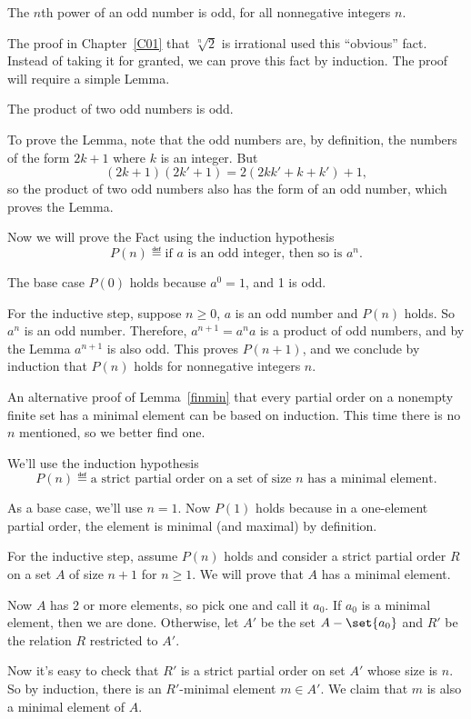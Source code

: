 \begin{fact*}
The $n$th power of an odd number is odd, for all nonnegative integers $n$.
\end{fact*}
The proof in Chapter~\ref{C01} that $\sqrt[n]{2}$ is irrational used this 
``obvious'' fact.  Instead of taking it for granted, we can prove this fact
by induction.
The proof will require a simple Lemma.
\begin{lemma*}
The product of two odd numbers is odd.
\end{lemma*}
To prove the Lemma, note that the odd numbers are, by definition, the
numbers of the form $2k+1$ where $k$ is an integer.  But
\[
(2k+1)(2k'+1) = 2(2kk' + k + k')+1,
\]
so the product of two odd numbers also has the form of an odd number,
which proves the Lemma.

Now we will prove the Fact using the induction hypothesis
\[
P(n) \eqdef \text{if $a$ is an odd integer, then so is $a^{n}$}.
\]

The base case $P(0)$ holds because $a^{0} =1$, and 1 is odd.

For the inductive step, suppose $n\geq 0$, $a$ is an odd number and $P(n)$
holds.  So $a^n$ is an odd number.  Therefore, $a^{n+1} = a^{n}a$ is a
product of odd numbers, and by the Lemma $a^{n+1}$ is also odd.  This
proves $P(n+1)$, and we conclude by induction that $P(n)$ holds for
nonnegative integers $n$.
\fi

\iffalse
An alternative proof of Lemma~\ref{finmin} that every partial order on a
nonempty finite set has a minimal element can be based on induction.  This
time there is no $n$ mentioned, so we better find one.

We'll use the induction hypothesis
\[
P(n) \eqdef \text{a strict partial order on a set of size $n$ has a minimal
  element}.
\]

As a base case, we'll use $n=1$.  Now $P(1)$ holds because in a
one-element partial order, the element is minimal (and maximal) by
definition.

For the inductive step, assume $P(n)$ holds and consider a strict partial
order $R$ on a set $A$ of size $n+1$ for $n \geq 1$.  We will prove
that $A$ has a minimal element.

Now $A$ has 2 or more elements, so pick one and call it $a_0$.  If $a_0$
is a minimal element, then we are done.  Otherwise, let $A'$ be the set $A
- \set{a_0}$ and $R'$ be the relation $R$ restricted to $A'$.

Now it's easy to check that $R'$ is a strict partial order on set $A'$
whose size is $n$.  So by induction, there is an $R'$-minimal element $m
\in A'$.  We claim that $m$ is also a minimal element of $A$.

